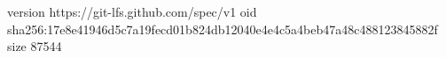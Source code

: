 version https://git-lfs.github.com/spec/v1
oid sha256:17e8e41946d5c7a19fecd01b824db12040e4e4c5a4beb47a48c488123845882f
size 87544
